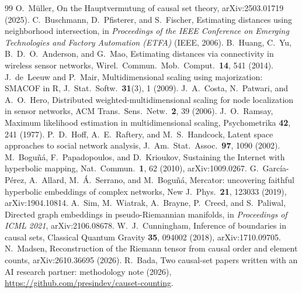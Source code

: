 \documentclass[prd,twocolumn,superscriptaddress,nofootinbib,amsmath,amssymb,floatfix]{revtex4-2}
\begin{document}
\begin{thebibliography}{99}
 O.~M\"uller, On the Hauptvermutung of causal set theory, arXiv:2503.01719 (2025).
 C.~Buschmann, D.~Pfisterer, and S.~Fischer, Estimating distances using neighborhood intersection, in \emph{Proceedings of the IEEE Conference on Emerging Technologies and Factory Automation (ETFA)} (IEEE, 2006).
 B.~Huang, C.~Yu, B.~D.~O.~Anderson, and G.~Mao, Estimating distances via connectivity in wireless sensor networks, Wirel.\ Commun.\ Mob.\ Comput.\ \textbf{14}, 541 (2014).
 J.~de~Leeuw and P.~Mair, Multidimensional scaling using majorization: SMACOF in R, J.\ Stat.\ Softw.\ \textbf{31}(3), 1 (2009).
 J.~A.~Costa, N.~Patwari, and A.~O.~Hero, Distributed weighted-multidimensional scaling for node localization in sensor networks, ACM Trans.\ Sens.\ Netw.\ \textbf{2}, 39 (2006).
 J.~O.~Ramsay, Maximum likelihood estimation in multidimensional scaling, Psychometrika \textbf{42}, 241 (1977).
 P.~D.~Hoff, A.~E.~Raftery, and M.~S.~Handcock, Latent space approaches to social network analysis, J.\ Am.\ Stat.\ Assoc.\ \textbf{97}, 1090 (2002).
 M.~Bogu\~n\'a, F.~Papadopoulos, and D.~Krioukov, Sustaining the Internet with hyperbolic mapping, Nat.\ Commun.\ \textbf{1}, 62 (2010), arXiv:1009.0267.
 G.~Garc\'ia-P\'erez, A.~Allard, M.~\'A.~Serrano, and M.~Bogu\~n\'a, Mercator: uncovering faithful hyperbolic embeddings of complex networks, New J.\ Phys.\ \textbf{21}, 123033 (2019), arXiv:1904.10814.
 A.~Sim, M.~Wiatrak, A.~Brayne, P.~Creed, and S.~Paliwal, Directed graph embeddings in pseudo-Riemannian manifolds, in \emph{Proceedings of ICML 2021}, arXiv:2106.08678.
 W.~J.~Cunningham, Inference of boundaries in causal sets, Classical Quantum Gravity \textbf{35}, 094002 (2018), arXiv:1710.09705.
 N.~Madsen, Reconstruction of the Riemann tensor from causal order and element counts, arXiv:2610.36695 (2026).
 R.~Bada, Two causal-set papers written with an AI research partner: methodology note (2026), \url{https://github.com/presindev/causet-counting}.
\end{thebibliography}
\end{document}
